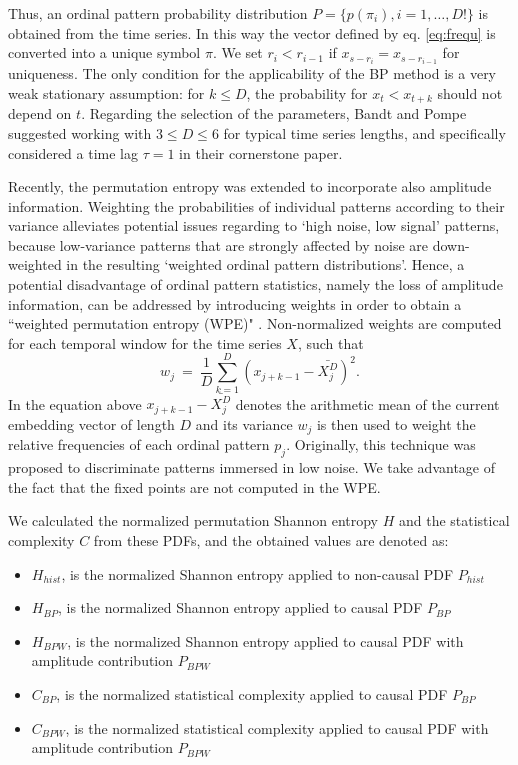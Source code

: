 Thus, an ordinal pattern probability distribution $P = \{ p(\pi_i), i = 1, \dots, D! \}$ is obtained from the time series.
In this way the vector defined by eq. \eqref{eq:frequ} is converted into a unique symbol $\pi$.
We set $r_i < r_{i-1}$ if $x_{s-r_{i}} = x_{s-r_{i-1}}$ for uniqueness.
The only condition for the applicability of the BP method is a very weak stationary assumption: for $k \leq D$, the probability for $x_t < x_{t+k}$ should not depend on $t$.
Regarding the selection of the parameters, Bandt and Pompe suggested working with $3 \leq D \leq 6$ for typical time series lengths, and specifically considered a time lag $\tau = 1$ in their cornerstone paper.

Recently, the permutation entropy was extended to incorporate also amplitude information.
Weighting the probabilities of individual patterns according to their variance alleviates potential issues regarding to ‘high noise, low signal’ patterns, because low-variance patterns that are strongly affected by noise are down-weighted in the resulting ‘weighted ordinal pattern distributions’.
Hence, a potential disadvantage of ordinal pattern statistics, namely the loss of amplitude information, can be addressed by introducing weights in order to obtain a ``weighted permutation entropy (WPE)" \cite{Fadlallah2013}.
Non-normalized weights are computed for each temporal window for the time series $X$, such that
\begin{equation}
\label{WPE_weigth}
w_j~=~\frac{1}{D}\sum_{k=1}^{D} \left(x_{j+k-1}-\bar{X_j^D}\right)^2.
\end{equation}
In the equation above $x_{j+k-1}-\bar{X_j^D}$ denotes the arithmetic mean of the current embedding vector of length $D$ and its variance $w_j$ is then used to weight the relative frequencies of each ordinal pattern $p_j$.
Originally, this technique was proposed to discriminate patterns immersed in low noise.
We take advantage of the fact that the fixed points are not computed in the WPE.

We calculated the normalized permutation Shannon entropy $H$ and the statistical complexity $C$ from these PDFs, and the obtained values are denoted as:
\begin{itemize}
	\item $H_{hist}$, is the normalized Shannon entropy applied to non-causal PDF $P_{hist}$
	\item $H_{BP}$, is the normalized Shannon entropy applied to causal PDF $P_{BP}$
	\item $H_{BPW}$, is the normalized Shannon entropy applied to causal PDF with amplitude contribution $P_{BPW}$
	\item $C_{BP}$, is the normalized statistical complexity applied to causal PDF $P_{BP}$
	\item $C_{BPW}$, is the normalized statistical complexity applied to causal PDF with amplitude contribution $P_{BPW} $
\end{itemize}

